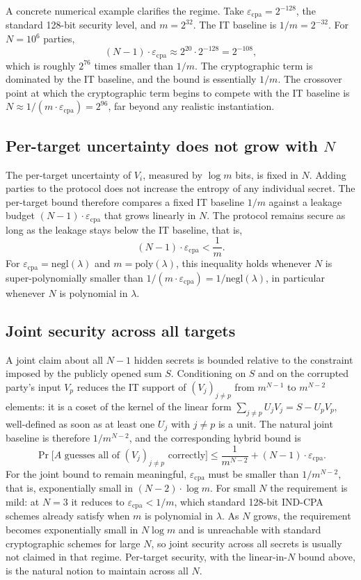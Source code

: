 \documentclass[11pt]{article}
\newcommand{\epscpa}{\varepsilon_{\mathrm{cpa}}}
\begin{document}
A concrete numerical example clarifies the regime. Take $\epscpa = 2^{-128}$, the standard 128-bit security level, and $m = 2^{32}$. The IT baseline is $1/m = 2^{-32}$. For $N = 10^6$ parties,
\[
(N-1) \cdot \epscpa \approx 2^{20} \cdot 2^{-128} = 2^{-108},
\]
which is roughly $2^{76}$ times smaller than $1/m$. The cryptographic term is dominated by the IT baseline, and the bound is essentially $1/m$. The crossover point at which the cryptographic term begins to compete with the IT baseline is $N \approx 1/(m \cdot \epscpa) = 2^{96}$, far beyond any realistic instantiation.

\subsection*{Per-target uncertainty does not grow with $N$}

The per-target uncertainty of $V_i$, measured by $\log m$ bits, is fixed in $N$. Adding parties to the protocol does not increase the entropy of any individual secret. The per-target bound therefore compares a fixed IT baseline $1/m$ against a leakage budget $(N-1) \cdot \epscpa$ that grows linearly in $N$. The protocol remains secure as long as the leakage stays below the IT baseline, that is,
\[
(N-1) \cdot \epscpa < \frac{1}{m}.
\]
For $\epscpa = \mathrm{negl}(\lambda)$ and $m = \mathrm{poly}(\lambda)$, this inequality holds whenever $N$ is super-polynomially smaller than $1/(m \cdot \epscpa) = 1/\mathrm{negl}(\lambda)$, in particular whenever $N$ is polynomial in $\lambda$.

\subsection*{Joint security across all targets}

A joint claim about all $N-1$ hidden secrets is bounded relative to the constraint imposed by the publicly opened sum $S$. Conditioning on $S$ and on the corrupted party's input $V_p$ reduces the IT support of $(V_j)_{j \neq p}$ from $m^{N-1}$ to $m^{N-2}$ elements: it is a coset of the kernel of the linear form $\sum_{j \neq p} U_j V_j = S - U_p V_p$, well-defined as soon as at least one $U_j$ with $j \neq p$ is a unit. The natural joint baseline is therefore $1/m^{N-2}$, and the corresponding hybrid bound is
\[
\Pr\big[ A \text{ guesses all of } (V_j)_{j \neq p} \text{ correctly} \big] \leq \frac{1}{m^{N-2}} + (N-1) \cdot \epscpa.
\]
For the joint bound to remain meaningful, $\epscpa$ must be smaller than $1/m^{N-2}$, that is, exponentially small in $(N-2) \cdot \log m$. For small $N$ the requirement is mild: at $N = 3$ it reduces to $\epscpa < 1/m$, which standard 128-bit IND-CPA schemes already satisfy when $m$ is polynomial in $\lambda$. As $N$ grows, the requirement becomes exponentially small in $N \log m$ and is unreachable with standard cryptographic schemes for large $N$, so joint security across all secrets is usually not claimed in that regime. Per-target security, with the linear-in-$N$ bound above, is the natural notion to maintain across all $N$.
\end{document}
